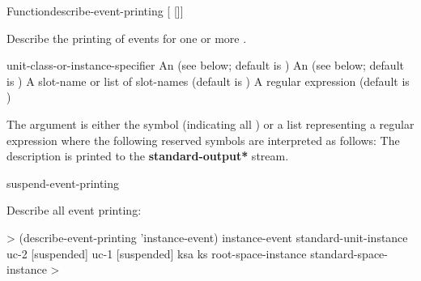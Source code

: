\documentclass[10pt,twoside,english,pdftex]{article}
\begin{document}
\begin{functiondoc}{Function}{describe-event-printing}%
  {[ 
    []] \\
     }
%
%


\fnsyntax

\fnpurpose Describe the printing of events for one or more
. 

\fnpackage {}

\fnmodule {}

\fnargs
\begin{args}{unit-class-or-instance-specifier}
 An  
(see below; default is )
 An 
(see below; default is )
 A slot-name or list of
slot-names (default is )
 A  regular
expression (default is \code{(*)})
\end{args}

\fndsyntax
\W\supp\tabletop
\eventclassspec
\subeventingspec
\syntaxsep
\unitclassinstancespec
\subclassingspec

\fndescription 
{}%
The  argument is either the symbol  (indicating
all ) or a list representing a regular
expression where the following reserved symbols are interpreted as
follows:
\spaceinstanceregexp
The description is printed to the {\bf *standard-output*} stream.

\begin{alsos}{suspend-event-printing}
\end{alsos}

\fnexample
Describe all event printing:
%
\W\supp
\begin{example}
  > (describe-event-printing 'instance-event)
  instance-event
    standard-unit-instance
    uc-2 [suspended]
    uc-1 [suspended]
    ksa
    ks
    root-space-instance
    standard-space-instance
  >
\end{example}

\fnnote
\instanceevfnsnyi

\end{functiondoc}
\end{document}
